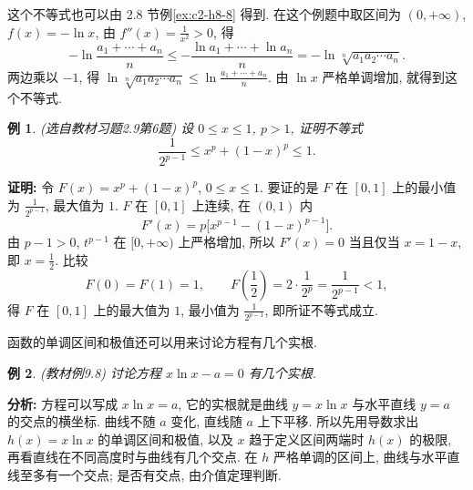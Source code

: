\documentclass[UTF8,openany]{ctexbook}
\theoremstyle{chinesetextbook}
\newtheorem{example}{例}[section]
\newenvironment{cnproof}{\par\indent\textbf{证明:} \ignorespaces}{\par}
\begin{document}
这个不等式也可以由 2.8 节例\ref{ex:c2-h8-8} 得到. 在这个例题中取区间为 $(0,+\infty)$, $f(x)=-\ln x$, 由 $\displaystyle f''(x)=\frac1{x^2}>0$, 得
\[
-\ln\frac{a_1+\cdots+a_n}n\le-\frac{\ln a_1+\cdots+\ln a_n}n=-\ln\sqrt[n]{a_1a_2\cdots a_n}.
\]
两边乘以 $-1$, 得 $\displaystyle\ln\sqrt[n]{a_1a_2\cdots a_n}\le\ln\frac{a_1+\cdots+a_n}n$. 由 $\ln x$ 严格单调增加, 就得到这个不等式.
\begin{example}\label{ex:c2-h9-6}
\textnormal{(选自教材习题2.9第6题)} 设 $0\le x\le1$, $p>1$, 证明不等式
\[
\frac1{2^{p-1}}\le x^p+(1-x)^p\le1.
\]
\end{example}
\begin{cnproof}
令 $F(x)=x^p+(1-x)^p$, $0\le x\le1$. 要证的是 $F$ 在 $[0,1]$ 上的最小值为 $\displaystyle\frac1{2^{p-1}}$, 最大值为 $1$. $F$ 在 $[0,1]$ 上连续, 在 $(0,1)$ 内
\[
F'(x)=p\bigl[x^{p-1}-(1-x)^{p-1}\bigr].
\]
由 $p-1>0$, $t^{p-1}$ 在 $[0,+\infty)$ 上严格增加, 所以 $F'(x)=0$ 当且仅当 $x=1-x$, 即 $\displaystyle x=\frac12$. 比较
\[
F(0)=F(1)=1,\qquad F\left(\frac12\right)=2\cdot\frac1{2^p}=\frac1{2^{p-1}}<1,
\]
得 $F$ 在 $[0,1]$ 上的最大值为 $1$, 最小值为 $\displaystyle\frac1{2^{p-1}}$, 即所证不等式成立.
\end{cnproof}
函数的单调区间和极值还可以用来讨论方程有几个实根.
\begin{example}\label{ex:c2-9-8}
\textnormal{(教材例9.8)} 讨论方程 $x\ln x-a=0$ 有几个实根.
\end{example}
\par\indent\textbf{分析:} 方程可以写成 $x\ln x=a$, 它的实根就是曲线 $y=x\ln x$ 与水平直线 $y=a$ 的交点的横坐标. 曲线不随 $a$ 变化, 直线随 $a$ 上下平移. 所以先用导数求出 $h(x)=x\ln x$ 的单调区间和极值, 以及 $x$ 趋于定义区间两端时 $h(x)$ 的极限, 再看直线在不同高度时与曲线有几个交点. 在 $h$ 严格单调的区间上, 曲线与水平直线至多有一个交点; 是否有交点, 由介值定理判断.
\end{document}
